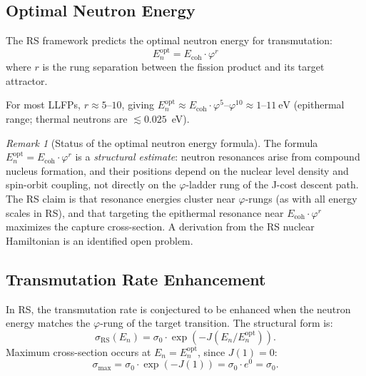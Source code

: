 \documentclass[12pt,a4paper]{article}
\theoremstyle{definition}
\theoremstyle{remark}
\newtheorem{remark}[theorem]{Remark}
\begin{document}
\subsection{Optimal Neutron Energy}

The RS framework predicts the optimal neutron energy for transmutation:
\begin{equation}
E_n^\mathrm{opt} = E_\mathrm{coh} \cdot \varphi^r
\end{equation}
where $r$ is the rung separation between the fission product and its target attractor.

For most LLFPs, $r \approx 5$--$10$, giving
$E_n^\mathrm{opt} \approx E_\mathrm{coh} \cdot \varphi^5$--$\varphi^{10}
\approx 1$--$11~\mathrm{eV}$ (epithermal range; thermal neutrons are $\lesssim 0.025$~eV).

\begin{remark}[Status of the optimal neutron energy formula]
The formula $E_n^\mathrm{opt} = E_\mathrm{coh} \cdot \varphi^r$ is a
\emph{structural estimate}: neutron resonances arise from compound nucleus
formation, and their positions depend on the nuclear level density and
spin-orbit coupling, not directly on the $\varphi$-ladder rung of the
J-cost descent path.  The RS claim is that resonance energies cluster
near $\varphi$-rungs (as with all energy scales in RS), and that
targeting the epithermal resonance near $E_\mathrm{coh} \cdot \varphi^r$
maximizes the capture cross-section.  A derivation from the RS nuclear
Hamiltonian is an identified open problem.
\end{remark}

\subsection{Transmutation Rate Enhancement}

In RS, the transmutation rate is conjectured to be enhanced when the neutron
energy matches the $\varphi$-rung of the target transition.  The structural
form is:
\begin{equation}
\sigma_\mathrm{RS}(E_n) = \sigma_0 \cdot \exp\!\left(-J(E_n / E_n^\mathrm{opt})\right).
\end{equation}
Maximum cross-section occurs at $E_n = E_n^\mathrm{opt}$, since $J(1) = 0$:
\begin{equation}
\sigma_\mathrm{max} = \sigma_0 \cdot \exp(-J(1)) = \sigma_0 \cdot e^0 = \sigma_0.
\end{equation}
\end{document}
